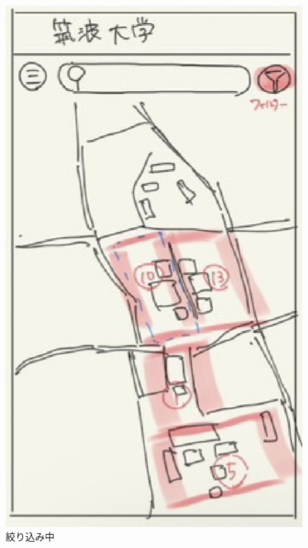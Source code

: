 \documentclass[12pt,a4paper,dvipdf]{jsarticle}
\begin{document}
\begin{figure}[H]
\begin{minipage}[b]{0.24\columnwidth}
        \includegraphics[width=0.9\columnwidth]{./img/絞り込み中.png}
        \caption{絞り込み中}
    \end{minipage}
    \begin{minipage}[b]{0.24\columnwidth}
        \centering

\end{minipage}
\end{figure}
\end{document}

